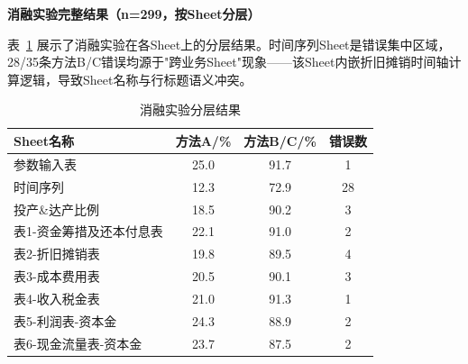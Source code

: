 \documentclass[10.5pt,compsoc,UTF8]{CjC}
\theoremstyle{mystyle}
\begin{document}
\vskip 1mm
















{\setlength\parindent{2em}
	\textbf{消融实验完整结果（n=299，按Sheet分层）}

	表~\ref{tab:appendix} 展示了消融实验在各Sheet上的分层结果。时间序列Sheet是错误集中区域，28/35条方法B/C错误均源于"跨业务Sheet"现象——该Sheet内嵌折旧摊销时间轴计算逻辑，导致Sheet名称与行标题语义冲突。

	\begin{table}[H]
		\centering
		\caption{消融实验分层结果}
		\label{tab:appendix}
		\vspace {-2.5mm}
		\begin{center}
			\begin{tabular}{lccc}
				\toprule
				Sheet名称 & 方法A/\% & 方法B/C/\% & 错误数 \\
				\hline
				参数输入表 & 25.0 & 91.7 & 1 \\
				时间序列 & 12.3 & 72.9 & 28 \\
				投产\&达产比例 & 18.5 & 90.2 & 3 \\
				表1-资金筹措及还本付息表 & 22.1 & 91.0 & 2 \\
				表2-折旧摊销表 & 19.8 & 89.5 & 4 \\
				表3-成本费用表 & 20.5 & 90.1 & 3 \\
				表4-收入税金表 & 21.0 & 91.3 & 1 \\
				表5-利润表-资本金 & 24.3 & 88.9 & 2 \\
				表6-现金流量表-资本金 & 23.7 & 87.5 & 2 \\
				\bottomrule
			\end{tabular}
		\end{center}
	\end{table}
}

%
%
\end{document}
